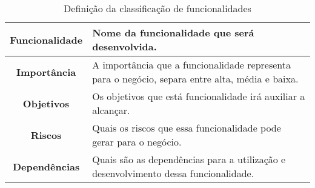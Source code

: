       \begin{table}[h!]
        \centering
        \begin{tabular}{|c|p{10cm}|}
          \hline
          \textbf{Funcionalidade} &
          Nome da funcionalidade que será desenvolvida. \\ \hline
          \textbf{Importância} &
          A importância que a funcionalidade representa para o negócio, separa entre
          alta, média e baixa. \\ \hline
          \textbf{Objetivos} &
          Os objetivos que está funcionalidade irá auxiliar a alcançar. \\ \hline
          \textbf{Riscos} &
          Quais os riscos que essa funcionalidade pode gerar para o negócio. \\ \hline
          \textbf{Dependências} &
          Quais são as dependências para a utilização e desenvolvimento dessa
          funcionalidade. \\ \hline
        \end{tabular}
        \caption{Definição da classificação de funcionalidades}
        \label{Tabela:1}
      \end{table}

